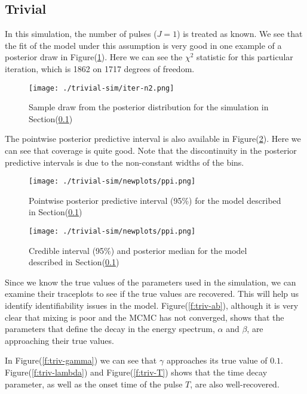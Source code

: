 \documentclass[iop,onecolumn]{emulateapj}
\newcommand{\Fig}[1]{Figure\thinspace(\ref{#1})}
\newcommand{\Sec}[1]{Section\thinspace(\ref{#1})}
\begin{document}
\subsection{Trivial}
\label{ss:trivial}
In this simulation, the number of pulses ($J=1$) is treated as known. We see that the fit of the model under this assumption is very good in one example of a posterior draw in \Fig{f:triv-post-sample}. Here we can see the $\chi^2$ statistic for this particular iteration, which is 1862 on 1717 degrees of freedom. 

\begin{figure}
 \centering
\texttt{[image: ./trivial-sim/iter-n2.png]}
 
\caption{Sample draw from the posterior distribution for the simulation in \Sec{ss:trivial}}
\label{f:triv-post-sample}
\end{figure}
The pointwise posterior predictive interval is also available in \Fig{f:triv-ppi}. Here we can see that coverage is quite good. Note that the discontinuity in the posterior predictive intervals is due to the non-constant widths of the bins.


\begin{figure}
 \centering
\texttt{[image: ./trivial-sim/newplots/ppi.png]}
\caption{Pointwise posterior predictive interval (95\%) for the model described in  \Sec{ss:trivial}}
\label{f:triv-ppi}
\end{figure}

\begin{figure}
 \centering
\texttt{[image: ./trivial-sim/newplots/ppi.png]}
\caption{Credible interval (95\%) and posterior median for the model described in  \Sec{ss:trivial}}
\label{f:triv-ci}
\end{figure}

Since we know the true values of the parameters used in the simulation, we can examine their traceplots to see if the true values are recovered. This will help us identify identifiability issues in the model. \Fig{f:triv-ab}, although it is very clear that mixing is poor and the MCMC has not converged, shows that the parameters that define the decay in the energy spectrum, $\alpha$ and $\beta$, are approaching their true values. 

In \Fig{f:triv-gamma} we can see that $\gamma$ approaches its true value of $0.1$. \Fig{f:triv-lambda} and \Fig{f:triv-T} shows that the time decay parameter, as well as the onset time of the pulse $T$, are also well-recovered.
\end{document}
